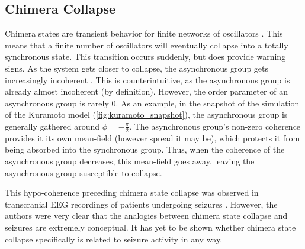 \subsection{Chimera Collapse}
\label{sec:lit_review_chimera_collapse}
Chimera states are transient behavior for finite networks of oscillators \cite{Wolfrum2011}.
This means that a finite number of oscillators will eventually collapse into a totally synchronous state.
This transition occurs suddenly, but does provide warning signs.
As the system gets closer to collapse, the asynchronous group gets increasingly incoherent \cite{Andrzejak2016}.
This is counterintuitive, as the asynchronous group is already almost incoherent (by definition).
However, the order parameter of an asynchronous group is rarely 0.
As an example, in the snapshot of the simulation of the Kuramoto model (\cref{fig:kuramoto_snapshot}), the asynchronous group is generally gathered around $\phi = -\frac{\pi}{2}$.
The asynchronous group's non-zero coherence provides it its own mean-field (however spread it may be), which protects it from being absorbed into the synchronous group.
Thus, when the coherence of the asynchronous group decreases, this mean-field goes away, leaving the asynchronous group susceptible to collapse.

This hypo-coherence preceding chimera state collapse was observed in transcranial EEG recordings of patients undergoing seizures \cite{Andrzejak2016}.
However, the authors were very clear that the analogies between chimera state collapse and seizures are extremely conceptual.
It has yet to be shown whether chimera state collapse specifically is related to seizure activity in any way.

